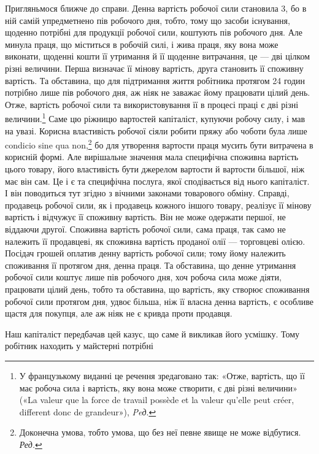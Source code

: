 Пригляньмося ближче до справи. Денна вартість робочої
сили становила 3, бо в ній самій упредметнено пів робочого
дня, тобто, тому що засоби існування, щоденно потрібні
для продукції робочої сили, коштують пів робочого дня. Але
минула праця, що міститься в робочій силі, і жива праця, яку
вона може виконати, щоденні кошти її утримання й її щоденне
витрачання, це — дві цілком різні величини. Перша визначає
її мінову вартість, друга становить її споживну вартість. Та
обставина, що для підтримання життя робітника протягом 24 годин
потрібно лише пів робочого дня, аж ніяк не заважає йому
працювати цілий день. Отже, вартість робочої сили та використовування
її в процесі праці є дві різні величини.\footnote*{
У французькому виданні це речення зредаговано так: «Отже, вартість,
що її має робоча сила і вартість, яку вона може створити, є дві різні
величини» («La valeur que la force de travail possède et la valeur qu’elle
peut créer, different donc de grandeur»), \emph{Peд}.
} Саме цю
ріжницю вартостей капіталіст, купуючи робочу силу, і мав на
увазі. Корисна властивість робочої сіяли робити пряжу або чоботи
була лише condicio sine qua non,\footnote*{
Доконечна умова, тобто умова, що без неї певне явище не може відбутися.
\emph{Ред.}
} бо для утворення вартости
праця мусить бути витрачена в корисній формі. Але вирішальне
значення мала специфічна споживна вартість цього товару, його
властивість бути джерелом вартости й вартости більшої, ніж має
він сам. Це і є та специфічна послуга, якої сподівається від нього
капіталіст. І він поводиться тут згідно з вічними законами товарового
обміну. Справді, продавець робочої сили, як і продавець
кожного іншого товару, реалізує її мінову вартість і відчужує її
споживну вартість. Він не може одержати першої, не віддаючи
другої. Споживна вартість робочої сили, сама праця, так само
не належить її продавцеві, як споживна вартість проданої олії —
торговцеві олією. Посідач грошей оплатив денну вартість робочої
сили; тому йому належить споживання її протягом дня, денна
праця. Та обставина, що денне утримання робочої сили коштує
лише пів робочого дня, хоч робоча сила може діяти, працювати
цілий день, тобто та обставина, що вартість, яку створює споживання
робочої сили протягом дня, удвоє більша, ніж її власна
денна вартість, є особливе щастя для покупця, але аж ніяк не
є кривда проти продавця.

Наш капіталіст передбачав цей казус, що саме й викликав
його усмішку. Тому робітник находить у майстерні потрібні
\parbreak{}  %
